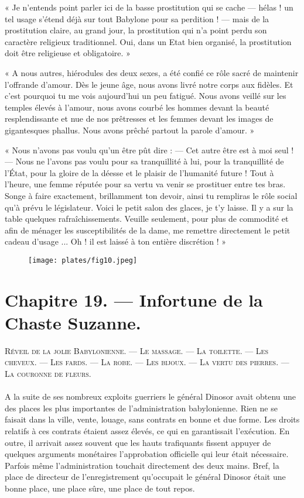 \documentclass[a4paper, 11pt, oneside, polutonikogreek, french]{article}
\begin{document}
« Je n'entends point parler ici de la basse prostitution qui se cache --- hélas ! un tel usage s'étend déjà sur tout Babylone pour sa perdition ! --- mais de la prostitution claire, au grand jour, la prostitution qui n'a point perdu son caractère religieux traditionnel. Oui, dans un Etat bien organisé, la prostitution doit être religieuse et obligatoire. »

« A nous autres, hiérodules des deux sexes, a été confié ce rôle sacré de maintenir l'offrande d'amour. Dès le jeune âge, nous avons livré notre corps aux fidèles. Et c'est pourquoi tu me vois aujourd'hui un peu fatigué. Nous avons veillé sur les temples élevés à l'amour, nous avons courbé les hommes devant la beauté resplendissante et nue de nos prêtresses et les femmes devant les images de gigantesques phallus. Nous avons prêché partout la parole d'amour. »

« Nous n'avons pas voulu qu'un être pût dire : --- Cet autre être est à moi seul ! --- Nous ne l'avons pas voulu pour sa tranquillité à lui, pour la tranquillité de l'État, pour la gloire de la déesse et le plaisir de l'humanité future ! Tout à l'heure, une femme réputée pour sa vertu va venir se prostituer entre tes bras. Songe à faire exactement, brillamment ton devoir, ainsi tu rempliras le rôle social qu'à prévu le législateur. Voici le petit salon des glaces, je t'y laisse. Il y a sur la table quelques rafraîchissements. Veuille seulement, pour plus de commodité et afin de ménager les susceptibilités de la dame, me remettre directement le petit cadeau d'usage ... Oh ! il est laissé à ton entière discrétion ! »
\clearpage
\begin{figure}[H]
\centering
\texttt{[image: plates/fig10.jpeg]}
\end{figure}
\section{Chapitre 19. --- Infortune de la Chaste Suzanne.}
\begin{center}
\scshape
\small
Réveil de la jolie Babylonienne. --- Le massage. --- La toilette. --- Les cheveux. --- Les fards. --- La robe. --- Les bijoux. --- La vertu des pierres. --- La couronne de fleurs.
\end{center}
\paragraph{}
A la suite de ses nombreux exploits guerriers le général Dinosor avait obtenu une des places les plus importantes de l'administration babylonienne. Rien ne se faisait dans la ville, vente, louage, sans contrats en bonne et due forme. Les droits relatifs à ces contrats étaient assez élevés, ce qui en garantissait l'exécution. En outre, il arrivait assez souvent que les hauts trafiquants fissent appuyer de quelques arguments monétaires l'approbation officielle qui leur était nécessaire. Parfois même l'administration touchait directement des deux mains. Bref, la place de directeur de l'enregistrement qu'occupait le général Dinosor était une bonne place, une place sûre, une place de tout repos.
\end{document}

